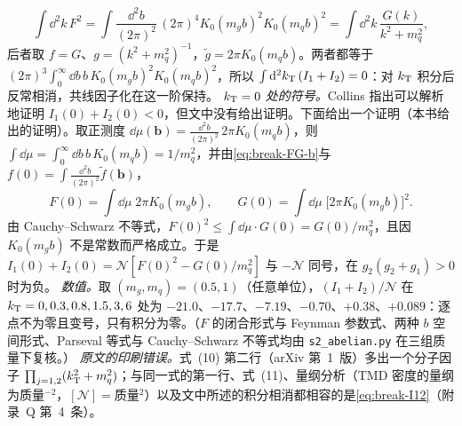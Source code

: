 \begin{example}
\[
\int\dd^2k\,F^2=\int\frac{\dd^2b}{(2\pi)^2}\,(2\pi)^4K_0(m_gb)^2K_0(m_qb)^2=\int\dd^2k\,\frac{G(k)}{k^2+m_q^2},
\]
后者取 $f=G$、$g=(k^2+m_q^2)^{-1}$，$\tilde g=2\pi K_0(m_qb)$。两者都等于 $(2\pi)^3\int_0^\infty\dd b\,b\,K_0(m_gb)^2K_0(m_qb)^2$，所以 $\int\mathrm{d}^2k_{\mathrm{T}}\,(I_1+I_2)=0$：对 $k_{\mathrm{T}}$ 积分后反常相消，共线因子化在这一阶保持。
\emph{$k_{\mathrm{T}}=0$ 处的符号。}Collins 指出可以解析地证明 $I_1(0)+I_2(0)<0$，但文中没有给出证明\cite{Collins2007}。下面给出一个证明（本书给出的证明）。取正测度 $\dd\mu(\boldsymbol b)=\frac{\dd^2b}{(2\pi)^2}\,2\pi K_0(m_qb)$，则 $\int\dd\mu=\int_0^\infty\dd b\,b\,K_0(m_qb)=1/m_q^2$，并由\cref{eq:break-FG-b}与 $f(0)=\int\frac{\dd^2b}{(2\pi)^2}\tilde f(\boldsymbol b)$，
\[
F(0)=\int\dd\mu\;2\pi K_0(m_gb),\qquad G(0)=\int\dd\mu\;\big[2\pi K_0(m_gb)\big]^2 .
\]
由 Cauchy--Schwarz 不等式，$F(0)^2\le\int\dd\mu\cdot G(0)=G(0)/m_q^2$，且因 $K_0(m_gb)$ 不是常数而严格成立。于是 $I_1(0)+I_2(0)=\mathcal N[F(0)^2-G(0)/m_q^2]$ 与 $-\mathcal N$ 同号，在 $g_2(g_2+g_1)>0$ 时为负。
\emph{数值。}取 $(m_g,m_q)=(0.5,1)$（任意单位），$(I_1+I_2)/\mathcal N$ 在 $k_{\mathrm{T}}=0,0.3,0.8,1.5,3,6$ 处为 $-21.0$、$-17.7$、$-7.19$、$-0.70$、$+0.38$、$+0.089$：逐点不为零且变号，只有积分为零。（$F$ 的闭合形式与 Feynman 参数式、两种 $b$ 空间形式、Parseval 等式与 Cauchy--Schwarz 不等式均由 \texttt{s2\_abelian.py} 在三组质量下复核。）
\emph{原文的印刷错误。}\cite{Collins2007}式~(10) 第二行（arXiv 第~1~版）多出一个分子因子 $\prod_{j=1,2}(k_{\mathrm{T}}^2+m_q^2)$；与同一式的第一行、式~(11)、量纲分析（TMD 密度的量纲为质量$^{-2}$，$[\mathcal N]=$质量$^2$）以及文中所述的积分相消都相容的是\cref{eq:break-I12}（附录~Q 第~4~条）。
\end{example}
